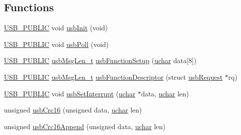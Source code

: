 \subsection*{Functions}
\begin{DoxyCompactItemize}
\item 
\hyperlink{mhvlib-_vusb-_console_2vusb_2usbdrv_8h_a5f6aa87267678dc37dd5d97a7b3df7c3}{U\-S\-B\-\_\-\-P\-U\-B\-L\-I\-C} void \hyperlink{mhvlib-_vusb-_console_2vusb_2usbdrv_8h_a5672a0c07f0f8e93bde4579d278e6307}{usb\-Init} (void)
\item 
\hyperlink{mhvlib-_vusb-_console_2vusb_2usbdrv_8h_a5f6aa87267678dc37dd5d97a7b3df7c3}{U\-S\-B\-\_\-\-P\-U\-B\-L\-I\-C} void \hyperlink{mhvlib-_vusb-_console_2vusb_2usbdrv_8h_a188162c29eb62ffbd2d33763d20e12b4}{usb\-Poll} (void)
\item 
\hyperlink{mhvlib-_vusb-_console_2vusb_2usbdrv_8h_a5f6aa87267678dc37dd5d97a7b3df7c3}{U\-S\-B\-\_\-\-P\-U\-B\-L\-I\-C} \hyperlink{mhvlib-_vusb-_console_2vusb_2usbdrv_8h_a57df3bf9fc8ec8cd9b29ba8dfc361059}{usb\-Msg\-Len\-\_\-t} \hyperlink{mhvlib-_vusb-_console_2vusb_2usbdrv_8h_a990d35fe479b1ee8abd7c169626b51f6}{usb\-Function\-Setup} (\hyperlink{mhvlib-_vusb-_console_2vusb_2usbdrv_8h_aa8ddf20cdd716b652e76e23e5e700893}{uchar} data\mbox{[}8\mbox{]})
\item 
\hyperlink{mhvlib-_vusb-_console_2vusb_2usbdrv_8h_a5f6aa87267678dc37dd5d97a7b3df7c3}{U\-S\-B\-\_\-\-P\-U\-B\-L\-I\-C} \hyperlink{mhvlib-_vusb-_console_2vusb_2usbdrv_8h_a57df3bf9fc8ec8cd9b29ba8dfc361059}{usb\-Msg\-Len\-\_\-t} \hyperlink{mhvlib-_vusb-_console_2vusb_2usbdrv_8h_a36e4115eff7bf97a7132f6308f923b2b}{usb\-Function\-Descriptor} (struct \hyperlink{structusb_request}{usb\-Request} $\ast$rq)
\item 
\hyperlink{mhvlib-_vusb-_console_2vusb_2usbdrv_8h_a5f6aa87267678dc37dd5d97a7b3df7c3}{U\-S\-B\-\_\-\-P\-U\-B\-L\-I\-C} void \hyperlink{mhvlib-_vusb-_console_2vusb_2usbdrv_8h_aafa474a799eed02d362bfdfb8a36602c}{usb\-Set\-Interrupt} (\hyperlink{mhvlib-_vusb-_console_2vusb_2usbdrv_8h_aa8ddf20cdd716b652e76e23e5e700893}{uchar} $\ast$data, \hyperlink{mhvlib-_vusb-_console_2vusb_2usbdrv_8h_aa8ddf20cdd716b652e76e23e5e700893}{uchar} len)
\item 
unsigned \hyperlink{mhvlib-_vusb-_console_2vusb_2usbdrv_8h_a504d52f57f31b4e78beb03f706a542e3}{usb\-Crc16} (unsigned data, \hyperlink{mhvlib-_vusb-_console_2vusb_2usbdrv_8h_aa8ddf20cdd716b652e76e23e5e700893}{uchar} len)
\item 
unsigned \hyperlink{mhvlib-_vusb-_console_2vusb_2usbdrv_8h_a19659c3a47ead1ffaa62d50237390f12}{usb\-Crc16\-Append} (unsigned data, \hyperlink{mhvlib-_vusb-_console_2vusb_2usbdrv_8h_aa8ddf20cdd716b652e76e23e5e700893}{uchar} len)
\end{DoxyCompactItemize}
